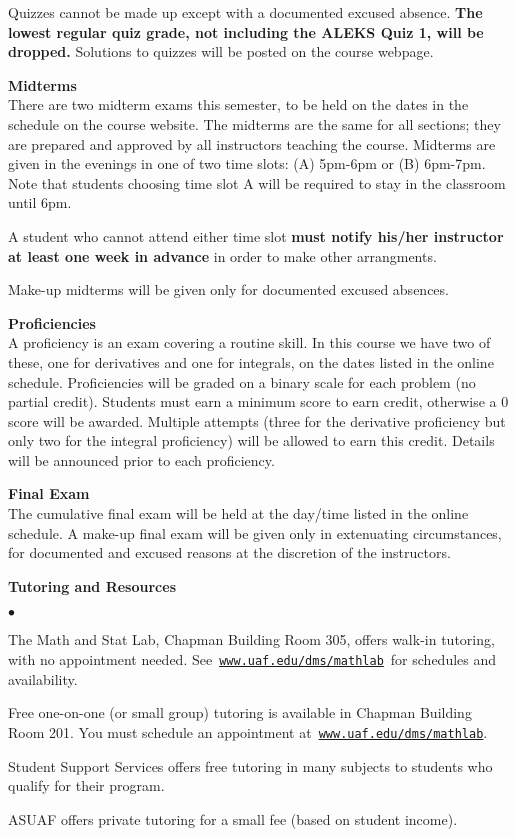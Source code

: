 \documentclass[12pt]{article}
\renewcommand{\emph}[1]{\textsf{\textbf{#1}}}
\newcommand{\localhead}[1]{\par\smallskip\textbf{#1}\nobreak\\}%
\def\heading#1{\localhead{\large\emph{#1}}}
\newenvironment{clist}%
{\bgroup\parskip 0pt\begin{list}{$\bullet$}{\partopsep 4pt\topsep 0pt\itemsep -2pt}}%
{\end{list}\egroup}%
\begin{document}
Quizzes cannot be made up except with a documented excused absence.  \emph{The lowest regular quiz grade, not including the ALEKS Quiz 1, will be dropped.}  Solutions to quizzes will be posted on the course webpage.

\heading{Midterms}
There are two midterm exams this semester, to be held on the dates in the schedule on the course website.  The midterms are the same for all sections; they are prepared and approved by all instructors teaching the course. Midterms are given in the evenings in one of two time slots: (A) 5pm-6pm or (B) 6pm-7pm. Note that students choosing time slot A will be required to stay in the classroom until 6pm.

A student who cannot attend either time slot \emph{must notify his/her instructor at least one week in advance} in order to make other arrangments.

Make-up midterms will be given only for documented excused absences.

\heading{Proficiencies}
A proficiency is an exam covering a routine skill.  In this course we have two of these, one for derivatives and one for integrals, on the dates listed in the online schedule.  Proficiencies will be graded on a binary scale for each problem (no partial credit).  Students must earn a minimum score to earn credit, otherwise a 0 score will be awarded. Multiple attempts (three for the derivative proficiency but only two for the integral proficiency) will be allowed to earn this credit.  Details will be announced prior to each proficiency.

\heading{Final Exam}
The cumulative final exam will be held at the day/time listed in the online schedule. A make-up final exam will be given only in extenuating circumstances, for documented and excused reasons at the discretion of the instructors.

\heading{Tutoring and Resources}
\vskip -30pt\strut
\begin{clist}
	\item The Math and Stat Lab, Chapman Building Room 305, offers walk-in tutoring, with no appointment needed.  See\, \href{http://www.uaf.edu/dms/mathlab/}{\texttt{www.uaf.edu/dms/mathlab}}\, for schedules and availability.
	\item Free one-on-one (or small group) tutoring is available in Chapman Building Room 201. You must schedule an appointment at\, \href{http://www.uaf.edu/dms/mathlab/}{\texttt{www.uaf.edu/dms/mathlab}}.
	\item Student Support Services offers free tutoring in many subjects to students who qualify for their program.
	\item ASUAF offers private tutoring for a small fee (based on student income).
\end{clist}
\end{document}
